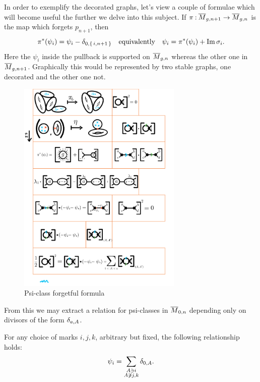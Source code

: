 \documentclass[12pt]{memoir}
\begin{document}
\begin{Ex}\label{ex-psi-class-forgetful-identity}
    In order to exemplify the decorated graphs, let's view a couple of formulae which will become useful the further we delve into this subject. If $\pi\mathbin{:}\overline M_{g,n+1}\to\overline M_{g,n}$ is the map which forgets $p_{n+1}$, then 
    $$\pi^\ast(\psi_i)=\psi_i-\delta_{0,\{\,i,n+1\,\}}\quad\text{equivalently}\quad\psi_i=\pi^\ast(\psi_i)+\Im\sigma_i.$$
    Here the $\psi_i$ inside the pullback is supported on $\overline M_{g,n}$ whereas the other one in $\overline{M}_{g,n+1}$. Graphically this would be represented by two stable graphs, one decorated and the other one not.
    \begin{figure}[h!]
        \centering
        \includegraphics[width=0.7\textwidth, trim= 1.3cm 17cm 9cm 8cm,clip]{../figs/FigsDNnotability2.pdf}
        \caption{Psi-class forgetful formula}
        \label{fig:psi-class-forget}
    \end{figure}
\end{Ex}

From this we may extract a relation for psi-classes in $\overline{M}_{0,n}$ depending only on divisors of the form $\delta_{a,A}$.

\begin{Lem}\label{lem:divisor-sum-identity-psi-class}
    For any choice of marks $i,j,k$, arbitrary but fixed, the following relationship holds:
    $$\psi_i=\sum_{\substack{A\ni i\\ A\not\ni j,k}}\delta_{0,A}.$$
\end{Lem}
\end{document}
